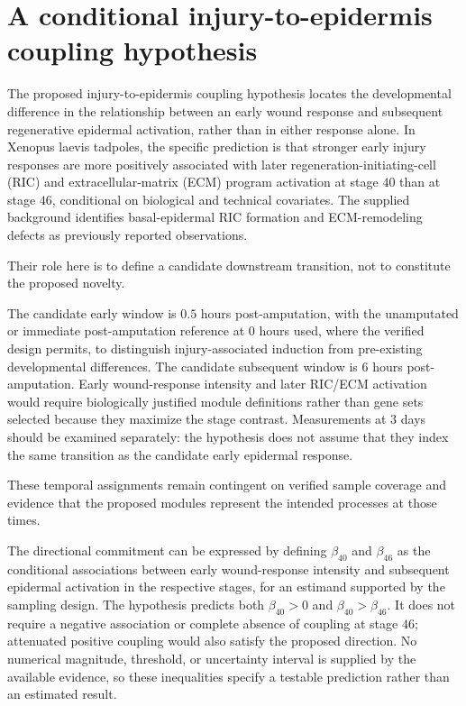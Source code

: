 \documentclass[11pt]{article}
\begin{document}
\section{A conditional injury-to-epidermis coupling hypothesis}
The proposed injury-to-epidermis coupling hypothesis locates the developmental difference in the relationship between an early wound response and subsequent regenerative epidermal activation, rather than in either response alone. In Xenopus laevis tadpoles, the specific prediction is that stronger early injury responses are more positively associated with later regeneration-initiating-cell (RIC) and extracellular-matrix (ECM) program activation at stage $40$ than at stage $46$, conditional on biological and technical covariates. The supplied background identifies basal-epidermal RIC formation and ECM-remodeling defects as previously reported observations.

Their role here is to define a candidate downstream transition, not to constitute the proposed novelty.

The candidate early window is $0.5$ hours post-amputation, with the unamputated or immediate post-amputation reference at $0$ hours used, where the verified design permits, to distinguish injury-associated induction from pre-existing developmental differences. The candidate subsequent window is $6$ hours post-amputation. Early wound-response intensity and later RIC/ECM activation would require biologically justified module definitions rather than gene sets selected because they maximize the stage contrast. Measurements at $3$ days should be examined separately: the hypothesis does not assume that they index the same transition as the candidate early epidermal response.

These temporal assignments remain contingent on verified sample coverage and evidence that the proposed modules represent the intended processes at those times.

The directional commitment can be expressed by defining $\beta_{40}$ and $\beta_{46}$ as the conditional associations between early wound-response intensity and subsequent epidermal activation in the respective stages, for an estimand supported by the sampling design. The hypothesis predicts both $\beta_{40}>0$ and $\beta_{40}>\beta_{46}$. It does not require a negative association or complete absence of coupling at stage $46$; attenuated positive coupling would also satisfy the proposed direction. No numerical magnitude, threshold, or uncertainty interval is supplied by the available evidence, so these inequalities specify a testable prediction rather than an estimated result.
\end{document}
